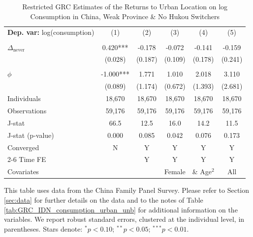 \begin{table}[htbp] \centering \begin{threeparttable}
 \caption{Restricted GRC Estimates of the Returns to Urban Location on log Consumption in China, Weak Province & No Hukou Switchers} 
 \label{tab:GRC_CHN_w_same_consumption_urban_unb} 
\begin{tabular}{l ccccc} \toprule  \textbf{Dep. var:}  log(consumption) 
                    &\multicolumn{1}{c}{(1)}   &\multicolumn{1}{c}{(2)}   &\multicolumn{1}{c}{(3)}   &\multicolumn{1}{c}{(4)}   &\multicolumn{1}{c}{(5)}   \\
                    &               &               &               &               &               \\
\addlinespace
$\Delta_{\text{never}}$&       0.420***&      -0.178   &      -0.072   &      -0.141   &      -0.159   \\
                    &     (0.028)   &     (0.187)   &     (0.109)   &     (0.178)   &     (0.241)   \\
                    &               &               &               &               &               \\
\addlinespace
$\phi$              &      -1.000***&       1.771   &       1.010   &       2.018   &       3.110   \\
                    &     (0.089)   &     (1.174)   &     (0.672)   &     (1.393)   &     (2.681)   \\
\addlinespace
Individuals         &      18,670   &      18,670   &      18,670   &      18,670   &      18,670   \\
Observations        &      59,176   &      59,176   &      59,176   &      59,176   &      59,176   \\
J-stat              &        66.5   &        12.5   &        16.0   &        14.2   &        11.5   \\
J-stat (p-value)    &       0.000   &       0.085   &       0.042   &       0.076   &       0.173   \\
Converged           &           N   &           Y   &           Y   &           Y   &           Y   \\
\cmidrule{2-6} Time FE & & Y & Y & Y & Y \\ Covariates & & & Female & \& Age$^2$ & All \\ \bottomrule \end{tabular} \begin{tablenotes}[flushleft] \footnotesize \item{This table uses data from the China Family Panel Survey. Please refer to Section \ref{sec:data} for further details on the data and to the notes of Table \ref{tab:GRC_IDN_consumption_urban_unb} for additional information on the variables. We report robust standard errors, clustered at the individual level, in parentheses. Stars denote: $^{*} p<0.10$; $^{**} p<0.05$; $^{***} p<0.01$.} \end{tablenotes} \end{threeparttable} \end{table}
